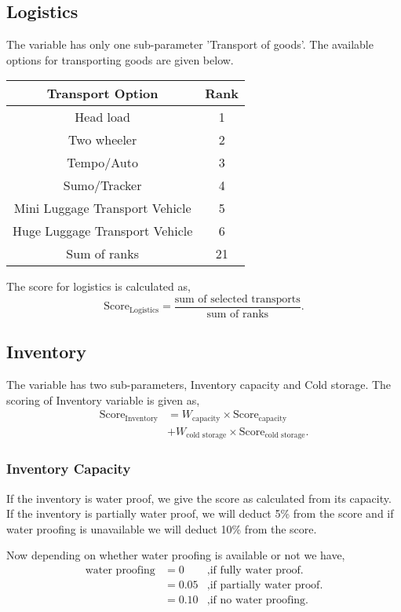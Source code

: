 \documentclass[oneside,twocolumn]{article}
\begin{document}
\subsection{Logistics}
The variable has only one sub-parameter 'Transport of goods'. The available options for transporting goods are given below.
\begin{center}
  \begin{tabular}{c | c}
    \hline
    Transport Option & Rank \\ \hline
    Head load & 1 \\
    Two wheeler & 2 \\
    Tempo/Auto & 3 \\
    Sumo/Tracker & 4 \\
    Mini Luggage Transport Vehicle & 5 \\
    Huge Luggage Transport Vehicle & 6 \\ \hline
    Sum of ranks & 21 \\ \hline
  \end{tabular}
\end{center}

The score for logistics is calculated as,
\[
\text{Score}_{\text{Logistics}} = \dfrac{\text{sum of selected transports}}{\text{sum of ranks}}.
\]

\subsection{Inventory}
The variable has two sub-parameters, Inventory capacity and Cold storage. The scoring of Inventory variable is given as,
\begin{align*}
  \text{Score}_{\text{Inventory}} &= W_{\text{capacity}} \times \text{Score}_{\text{capacity}} \\
  &+ W_{\text{cold storage}} \times \text{Score}_{\text{cold storage}}.
\end{align*}

\subsubsection{Inventory Capacity}
If the inventory is water proof, we give the score as calculated from its capacity. If the inventory is partially water proof, we will deduct 5\% from the score and if water proofing is unavailable we will deduct 10\% from the score.

Now depending on whether water proofing is available or not we have,
\begin{align*}
  \text{water proofing} &= 0 &, \text{if fully water proof.} \\
  &= 0.05 &, \text{if partially water proof.} \\
  &= 0.10 &, \text{if no water proofing.}
\end{align*}
\end{document}
